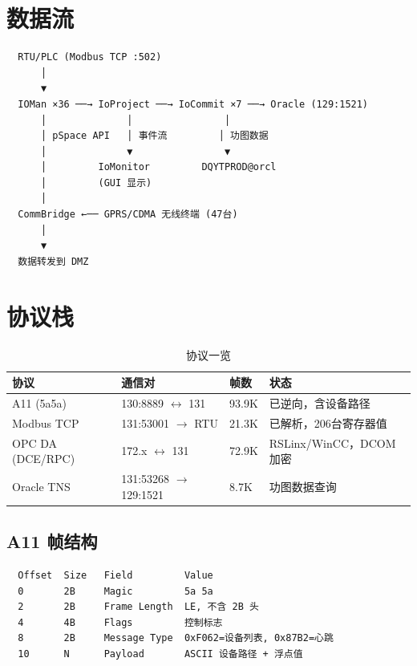 \documentclass[12pt,a4paper]{ctexart}
\begin{document}
\section{数据流}

\begin{verbatim}
  RTU/PLC (Modbus TCP :502)
      │
      ▼
  IOMan ×36 ──→ IoProject ──→ IoCommit ×7 ──→ Oracle (129:1521)
      │              │                │
      │ pSpace API   │ 事件流         │ 功图数据
      │              ▼                ▼
      │         IoMonitor         DQYTPROD@orcl
      │         (GUI 显示)
      │
  CommBridge ←── GPRS/CDMA 无线终端 (47台)
      │
      ▼
  数据转发到 DMZ
\end{verbatim}

\section{协议栈}

\begin{table}[H]\centering
\caption{协议一览}
\begin{tabular}{p{2.5cm}p{5cm}p{1.5cm}p{3.5cm}}
\toprule
\textbf{协议} & \textbf{通信对} & \textbf{帧数} & \textbf{状态} \\
\midrule
A11 (5a5a) & 130:8889 $\leftrightarrow$ 131 & 93.9K & 已逆向，含设备路径 \\
Modbus TCP & 131:53001 $\rightarrow$ RTU & 21.3K & 已解析，206台寄存器值 \\
OPC DA (DCE/RPC) & 172.x $\leftrightarrow$ 131 & 72.9K & RSLinx/WinCC，DCOM 加密 \\
Oracle TNS & 131:53268 $\rightarrow$ 129:1521 & 8.7K & 功图数据查询 \\
\bottomrule
\end{tabular}
\end{table}

\subsection{A11 帧结构}

\begin{verbatim}
  Offset  Size   Field         Value
  0       2B     Magic         5a 5a
  2       2B     Frame Length  LE, 不含 2B 头
  4       4B     Flags         控制标志
  8       2B     Message Type  0xF062=设备列表, 0x87B2=心跳
  10      N      Payload       ASCII 设备路径 + 浮点值
\end{verbatim}
\end{document}

